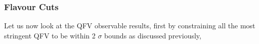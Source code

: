 
\subsubsection{Flavour Cuts }


Let us now look at the QFV observable results, first by constraining all the most stringent QFV to be within 2 $\sigma$ bounds as discussed previously,
%
%
%

